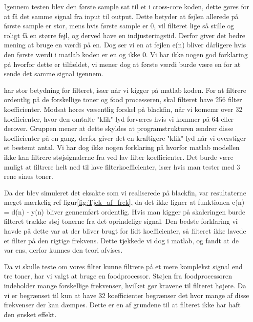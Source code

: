 \begin{description}[align=left]
\item [Første sample = 1.] Igennem testen blev den første sample sat til et i cross-core koden, dette gøres for at få det samme signal fra input til output. Dette betyder at fejlen allerede på første sample er stor, mens hvis første sample er 0, vil filteret lige så stille og roligt få en større fejl, og derved have en indjusteringstid. Derfor giver det bedre mening at bruge en værdi på en. Dog ser vi en at fejlen e(n) bliver dårligere hvis den første værdi i matlab koden er en og ikke 0. Vi har ikke nogen god forklaring på hvorfor dette er tilfældet, vi mener dog at første værdi burde være en for at sende det samme signal igennem. 
\item [Filter koefficienter] har stor betydning for filteret, især når vi kigger på matlab koden. For at filtrere ordentlig på de forskellige toner og food processeren, skal filteret have 256 filter koefficienter. Modsat høres væsentlig forskel på blackfin, når vi komemr over 32 koefficienter, hvor den omtalte "klik" lyd forværes hvis vi kommer på 64 eller derover. Gruppen mener at dette skyldes at programstrukturen ændrer disse koefficienter på en gang, derfor giver det en kraftigere "klik" lyd når vi overstiger et bestemt antal. Vi har dog ikke nogen forklaring på hvorfor matlab modellen ikke kan filtrere støjsignalerne fra ved lav filter koefficienter. Det burde være muligt at filtrere helt ned til lave filterkoefficienter, især hvis man tester med 3 rene sinus toner.   
\item [Simulering af realiseringen.] 
Da der blev simuleret det eksakte som vi realiserede på blackfin, var resultaterne meget mærkelig ref figur\ref{fig:Tjek_af_frek}, da det ikke ligner at funktionen e(n) = d(n) - y(n) bliver gennemført ordentlig. Hvis man kigger på skaleringen burde filteret trække støj tonerne fra det oprindelige signal. Den bedste forklaring vi havde på dette var at der bliver brugt for lidt koefficienter, så filteret ikke lavede et filter på den rigtige frekvens. Dette tjekkede vi dog i matlab, og fandt at de var ens, derfor kunnes den teori afvises. 
\item [Food processor realisering] Da vi skulle teste om vores filter kunne filtrere på et mere komplekst signal end tre toner, har vi valgt at bruge en foodprocessor. Støjen fra foodprocessoren indeholder mange forskellige frekvenser, hvilket gør kravene til filteret højere. Da vi er begrænset til kun at have 32 koefficienter begrænser det hvor mange af disse frekvenser der kan dæmpes. Dette er en af grundene til at filteret ikke har haft den ønsket effekt. 

\end{description}
